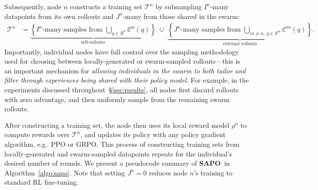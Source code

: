 \documentclass[11pt, a4paper, logo, singlecolumn, copyright]{gensyn}
\newcommand{\SAPO}{\textbf{SAPO}}
\begin{document}
Subsequently, node $n$ constructs a training set $\mathcal{T}^n$ by subsampling $I^n$-many datapoints from its own rollouts and $J^n$-many from those shared in the swarm:
\begin{align*}
\mathcal{T}^n &= \underbrace{\left\{I^n \text{-many samples from } \bigcup_{q\in\mathcal{B}^n} \mathcal{C}^n(q) \right\}}_{\text{self-rollouts}}
\;\cup\;
\underbrace{\left\{J^n \text{-many samples from } \bigcup_{m \neq n,~q\in\mathcal{S}^m} \mathcal{C}^m(q)\right\}}_{\text{external rollouts}}.
\end{align*}
Importantly, individual nodes have full control over the sampling methodology used for choosing between locally-generated or swarm-sampled rollouts---this is an important mechanism for \textit{allowing individuals in the swarm to both tailor and filter through experiences being shared with their policy model}. For example, in the experiments discussed throughout~\S\ref{sec:results}, all nodes first discard rollouts with zero advantage, and then uniformly sample from the remaining swarm rollouts.

After constructing a training set, the node then uses its local reward model $\rho^n$ to compute rewards over $\mathcal{T}^n$, and updates its policy with any policy gradient algorithm, e.g.~PPO or GRPO. This process of constructing training sets from locally-generated and swarm-sampled datapoints repeats for the individual's desired number of rounds. We present a pseudocode summary of \SAPO~in Algorithm~\ref{algo:sapo}. Note that setting $J^n = 0$ reduces node $n$'s training to standard RL fine-tuning.
\end{document}
